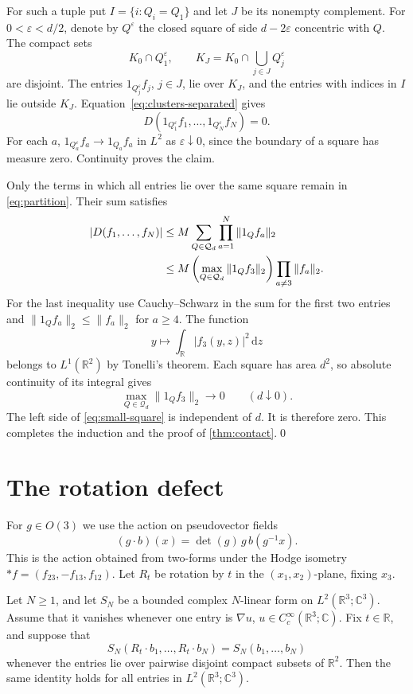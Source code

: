 \documentclass[11pt,letterpaper,reqno]{amsart}
\makeatletter
\theoremstyle{definition}
\newcommand{\ms@majorstart}{%
  \pushQED{\qed}\renewcommand{\qedsymbol}{$\blacksquare\square$}}
\newenvironment{corollary}[1][]{\ms@majorstart\ms@corollary[#1]}
  {\popQED\endms@corollary}
\theoremstyle{remark}
\newcommand{\R}{\mathbb R}
\newcommand{\C}{\mathbb C}
\newcommand{\dd}{\,\mathrm d}
\makeatother
\begin{document}
For such a tuple put $I=\{i:Q_i=Q_1\}$ and let $J$ be its nonempty
complement. For $0<\varepsilon<d/2$, denote by $Q^\varepsilon$ the
closed square of side $d-2\varepsilon$ concentric with $Q$.
The compact sets
\[
 K_0\cap Q_1^\varepsilon,
 \qquad K_J=K_0\cap\bigcup_{j\in J}Q_j^\varepsilon
\]
are disjoint. The entries $1_{Q_j^\varepsilon}f_j$, $j\in J$, lie
over $K_J$, and the entries with indices in $I$ lie outside $K_J$.
Equation~\eqref{eq:clusters-separated} gives
\[
 D(1_{Q_1^\varepsilon}f_1,\ldots,
                         1_{Q_N^\varepsilon}f_N)=0.
\]
For each $a$, $1_{Q_a^\varepsilon}f_a\to1_{Q_a}f_a$ in $L^2$ as
$\varepsilon\downarrow0$, since the boundary of a square has measure
zero. Continuity proves the claim.

Only the terms in which all entries lie over the same square remain in
\eqref{eq:partition}. Their sum satisfies
\begin{align}
 |D(f_1,\ldots,f_N)|
 &\le M\sum_{Q\in\mathcal Q_d}\prod_{a=1}^N\|1_Qf_a\|_2\notag\\
 &\le M\left(\max_{Q\in\mathcal Q_d}\|1_Qf_3\|_2\right)
             \prod_{a\ne3}\|f_a\|_2.
 \label{eq:small-square}
\end{align}
For the last inequality use Cauchy--Schwarz in the sum for the first
two entries and $\|1_Qf_a\|_2\le\|f_a\|_2$ for $a\ge4$.
The function
\[
 y\longmapsto\int_\R|f_3(y,z)|^2\dd z
\]
belongs to $L^1(\R^2)$ by Tonelli's theorem. Each square has area $d^2$,
so absolute continuity of its integral gives
\[
 \max_{Q\in\mathcal Q_d}\|1_Qf_3\|_2\longrightarrow0
                  \qquad(d\downarrow0).
\]
The left side of \eqref{eq:small-square} is independent of $d$.
It is therefore zero. This completes the induction and the proof of
\cref{thm:contact}.\qed

\section{The rotation defect}

For $g\in O(3)$ we use the action on pseudovector fields
\begin{equation}\label{eq:action}
 (g\cdot b)(x)=\det(g)\,g\,b(g^{-1}x).
\end{equation}
This is the action obtained from two-forms under the Hodge isometry
$*f=(f_{23},-f_{13},f_{12})$. Let $R_t$ be rotation by $t$ in the
$(x_1,x_2)$-plane, fixing $x_3$.

\begin{corollary}[From separated supports to all tests]\label{cor:rotation}
Let $N\ge1$, and let $S_N$ be a bounded complex $N$-linear form on
$L^2(\R^3;\C^3)$. Assume that it vanishes whenever one entry is
$\nabla u$, $u\in C_c^\infty(\R^3;\C)$. Fix $t\in\R$, and suppose that
\[
 S_N(R_t\cdot b_1,\ldots,R_t\cdot b_N)=S_N(b_1,\ldots,b_N)
\]
whenever the entries lie over pairwise disjoint compact subsets of
$\R^2$. Then the same identity holds for all entries in
$L^2(\R^3;\C^3)$.
\end{corollary}
\end{document}
